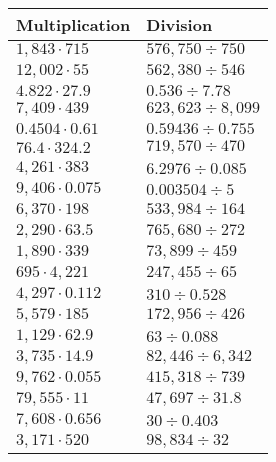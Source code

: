 \begin{longtable}[]{@{}ll@{}}
\toprule
Multiplication & Division\tabularnewline
\midrule
\endhead
\(1,843\cdot715\) & \(576,750 ÷750\)\tabularnewline
\(12,002\cdot55\) & \(562,380÷546\)\tabularnewline
\(4.822\cdot27.9\) & \(0.536÷7.78\)\tabularnewline
\(7,409\cdot439\) & \(623,623÷8,099\)\tabularnewline
\(0.4504\cdot0.61\) & \(0.59436÷0.755\)\tabularnewline
\(76.4\cdot324.2\) & \(719,570÷470\)\tabularnewline
\(4,261\cdot383\) & \(6.2976÷0.085\)\tabularnewline
\(9,406\cdot0.075\) & \(0.003504÷5\)\tabularnewline
\(6,370\cdot198\) & \(533,984÷164\)\tabularnewline
\(2,290\cdot63.5\) & \(765,680÷272\)\tabularnewline
\(1,890\cdot339\) & \(73,899÷459\)\tabularnewline
\(695\cdot4,221\) & \(247,455÷65\)\tabularnewline
\(4,297\cdot0.112\) & \(310÷0.528\)\tabularnewline
\(5,579\cdot185\) & \(172,956÷426\)\tabularnewline
\(1,129\cdot62.9\) & \(63÷0.088\)\tabularnewline
\(3,735\cdot14.9\) & \(82,446÷6,342\)\tabularnewline
\(9,762\cdot0.055\) & \(415,318÷739\)\tabularnewline
\(79,555\cdot11\) & \(47,697÷31.8\)\tabularnewline
\(7,608\cdot0.656\) & \(30÷0.403\)\tabularnewline
\(3,171\cdot520\) & \(98,834÷32\)\tabularnewline
\bottomrule
\end{longtable}
